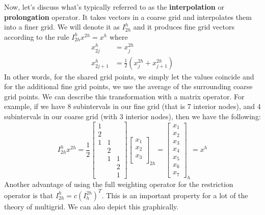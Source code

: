 \documentclass[11pt]{article}
\begin{document}
Now, let's discuss what's typically referred to as the
\textbf{interpolation} or \textbf{prolongation} operator. It takes
vectors in a coarse grid and interpolates them into a finer grid. We
will denote it as \(I_{2h}^h\) and it produces fine grid vectors
according to the rule \(I_{2h}^h x^{2h} = x^{h}\) where \begin{align*}
x_{2j}^h &= x_j^{2h} \\
x_{2j+1}^h &= \frac{1}{2} \left( x_j^{2h} + x_{j+1}^{2h} \right)
\end{align*} In other words, for the shared grid points, we simply let
the values coincide and for the additional fine grid points, we use the
average of the surrounding coarse grid points. We can describe this
transformation with a matrix operator. For example, if we have 8
subintervals in our fine grid (that is 7 interior nodes), and 4
subintervals in our coarse grid (with 3 interior nodes), then we have
the following: \[
I_{2h}^h x^{2h} = \frac{1}{2} 
\begin{bmatrix}
1 & & \\
2 & & \\
1 & 1 & \\
& 2 & \\
& 1 & 1 \\
& & 2 \\
& & 1
\end{bmatrix}
\begin{bmatrix}
x_1 \\ x_2 \\ x_3 \\
\end{bmatrix}_{2h}
= \begin{bmatrix}
x_1 \\ x_2 \\ x_3 \\ x_4 \\ x_5 \\ x_6 \\ x_7
\end{bmatrix}_h = x^h
\] Another advantage of using the full weighting operator for the
restriction operator is that \(I_{2h}^h = c(I_h^{2h})^T\). This is an
important property for a lot of the theory of multigrid. We can also
depict this graphically.
\end{document}
